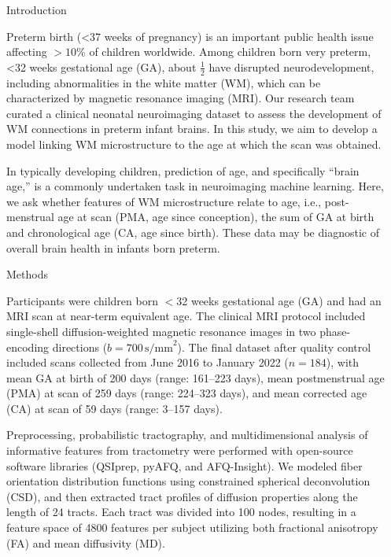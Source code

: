 \documentclass[final]{beamer}
\newlength{\sepwidth}
\newlength{\colwidth}
\newcommand{\separatorcolumn}{\begin{column}{\sepwidth}\end{column}}
\begin{document}
\begin{frame}[t]
\begin{columns}[t]
\separatorcolumn

\begin{column}{\colwidth}

  \begin{block}{Introduction}

    Preterm birth (\textless 37 weeks of pregnancy) is an important public health issue affecting $> 10\%$ of children worldwide. Among children born very preterm, \textless 32 weeks gestational age (GA), about $\frac{1}{2}$ have disrupted neurodevelopment, including abnormalities in the white matter (WM), which can be characterized by magnetic resonance imaging (MRI). Our research team curated a clinical neonatal neuroimaging dataset to assess the development of WM connections in preterm infant brains. In this study, we aim to develop a model linking WM microstructure to the age at which the scan was obtained. 

    In typically developing children, prediction of age, and specifically ``brain age,'' is a commonly undertaken task in neuroimaging machine learning. Here, we ask whether features of WM microstructure relate to age, i.e., post-menstrual age at scan (PMA, age since conception), the sum of GA at birth and chronological age (CA, age since birth). These data may be diagnostic of overall brain health in infants born preterm.

  \end{block}

  \begin{block}{Methods}

    Participants were children born $<$32 weeks gestational age (GA) and had an MRI scan at near-term equivalent age. The clinical MRI protocol included single-shell diffusion-weighted magnetic resonance images in two phase-encoding directions ($b=700\,\text{s/mm}^2$). The final dataset after quality control included scans collected from June 2016 to January 2022 ($n=184$), with mean GA at birth of 200 days (range: 161--223 days), mean postmenstrual age (PMA) at scan of 259 days (range: 224--323 days), and mean corrected age (CA) at scan of 59 days (range: 3--157 days). 

    Preprocessing, probabilistic tractography, and multidimensional analysis of informative features from tractometry were performed with open-source software libraries (QSIprep, pyAFQ, and AFQ-Insight). We modeled fiber orientation distribution functions using constrained spherical deconvolution (CSD), and then extracted tract profiles of diffusion properties along the length of 24 tracts. Each tract was divided into 100 nodes, resulting in a feature space of 4800 features per subject utilizing both fractional anisotropy (FA) and mean diffusivity (MD). 


\end{block}
\end{column}
\end{columns}
\end{frame}
\end{document}
